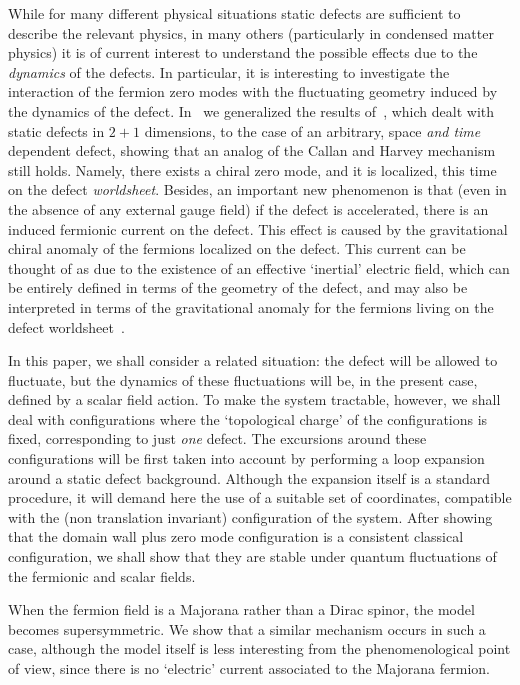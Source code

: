 \documentclass[a4paper,12pt]{article}
\begin{document}
While for many different physical situations static defects are
sufficient to describe the relevant physics, in many others
(particularly in condensed matter physics) it is of current interest
to understand the possible effects due to the {\em dynamics\/} of the
defects. In particular, it is interesting to investigate the
interaction of the fermion zero modes with the fluctuating geometry
induced by the dynamics of the defect.  In~\cite{ffl} we generalized
the results of~\cite{fl}, which dealt with static defects in $2+1$
dimensions, to the case of an arbitrary, space {\em and time\/}
dependent defect, showing that an analog of the Callan and Harvey
mechanism~\cite{callan} still holds. Namely, there exists a chiral
zero mode, and it is localized, this time on the defect {\em
  worldsheet}.  Besides, an important new phenomenon is that (even
in the absence of any external gauge field) if the defect is
accelerated, there is an induced fermionic current on the defect. This
effect is caused by the gravitational chiral anomaly of the fermions
localized on the defect.  This current can be thought of as due to the
existence of an effective `inertial' electric field, which can be
entirely defined in terms of the geometry of the defect, and may also
be interpreted in terms of the gravitational anomaly for the fermions
living on the defect worldsheet~\cite{kks}.

In this paper, we shall consider a related situation: the defect will
be allowed to fluctuate, but the dynamics of these fluctuations will
be, in the present case, defined by a scalar field action.  To make
the system tractable, however, we shall deal with configurations where
the `topological charge' of the configurations is fixed, corresponding
to just {\em one\/} defect.  The excursions around these
configurations will be first taken into account by performing a loop
expansion around a static defect background.  Although the expansion
itself is a standard procedure, it will demand here the use of a
suitable set of coordinates, compatible with the (non translation
invariant) configuration of the system. After showing that the domain
wall plus zero mode configuration is a consistent classical
configuration, we shall show that they are stable under quantum
fluctuations of the fermionic and scalar fields.

When the fermion field is a Majorana rather than a Dirac spinor, the model
becomes supersymmetric. We show that a similar mechanism occurs in
such a case, although the model itself is less interesting from the
phenomenological point of view, since there is no `electric' current 
associated to the Majorana fermion.
\end{document}

